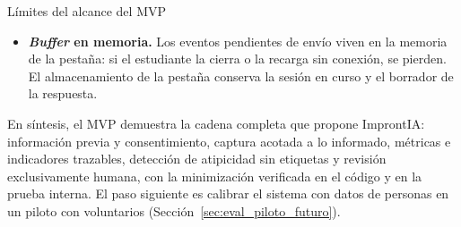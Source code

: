 \begin{opendecision}{Límites del alcance del MVP}
\begin{itemize}
    \item \textbf{\textit{Buffer} en memoria.} Los eventos pendientes de envío viven en la memoria de la pestaña: si el estudiante la cierra o la recarga sin conexión, se pierden. El almacenamiento de la pestaña conserva la sesión en curso y el borrador de la respuesta.
\end{itemize}
\end{opendecision}

En síntesis, el MVP demuestra la cadena completa que propone ImprontIA: información previa y consentimiento, captura acotada a lo informado, métricas e indicadores trazables, detección de atipicidad sin etiquetas y revisión exclusivamente humana, con la minimización verificada en el código y en la prueba interna. El paso siguiente es calibrar el sistema con datos de personas en un piloto con voluntarios (Sección~\ref{sec:eval_piloto_futuro}).
\endgroup
